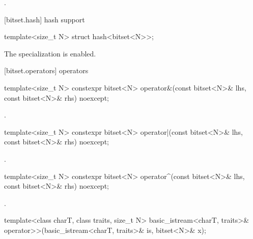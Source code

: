 \begin{itemdescr}
\pnum
\returns
{}.
\end{itemdescr}

[bitset.hash]{ hash support}

%
\begin{itemdecl}
template<size_t N> struct hash<bitset<N>>;
\end{itemdecl}

\begin{itemdescr}
\pnum
The specialization is enabled.
\end{itemdescr}


[bitset.operators]{ operators}

%
\begin{itemdecl}
template<size_t N>
  constexpr bitset<N> operator&(const bitset<N>& lhs, const bitset<N>& rhs) noexcept;
\end{itemdecl}

\begin{itemdescr}
\pnum
\returns
{}.
\end{itemdescr}

%
\begin{itemdecl}
template<size_t N>
  constexpr bitset<N> operator|(const bitset<N>& lhs, const bitset<N>& rhs) noexcept;
\end{itemdecl}

\begin{itemdescr}
\pnum
\returns
{}.
\end{itemdescr}

%
\begin{itemdecl}
template<size_t N>
  constexpr bitset<N> operator^(const bitset<N>& lhs, const bitset<N>& rhs) noexcept;
\end{itemdecl}

\begin{itemdescr}
\pnum
\returns
{}.
\end{itemdescr}

%
\begin{itemdecl}
template<class charT, class traits, size_t N>
  basic_istream<charT, traits>&
    operator>>(basic_istream<charT, traits>& is, bitset<N>& x);
\end{itemdecl}

